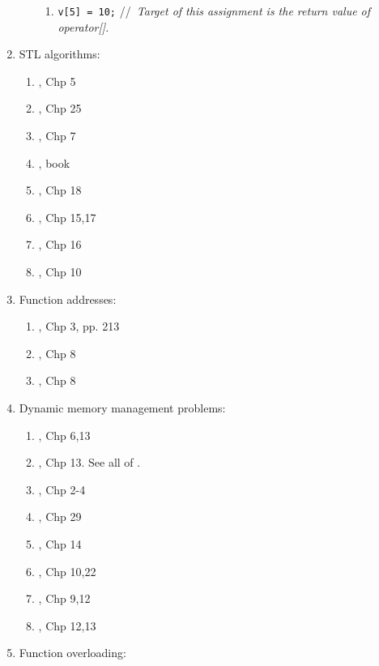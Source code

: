 \begin{enumerate}
\begin{enumerate}
\begin{enumerate}
		\item {\tt v[5] = 10;} //{\it\ Target of this assignment is the return value of operator[].}
		\end{enumerate}
	\end{enumerate}
\item STL algorithms: \vspace{-0.3cm}
	\begin{enumerate} \itemsep -2pt
	\item \cite{Eckel2003}, Chp 5
	\item \cite{Oualline2003}, Chp 25
	\item \cite{Vermeir2001}, Chp 7
	\item \cite{Reese2006a}, book
	\item \cite{Allain2012}, Chp 18
	\item \cite{Gregoire2014}, Chp 15,17
	\item \cite{Prata2012}, Chp 16
	\item \cite{Lippman2013}, Chp 10
	\end{enumerate}
\item Function addresses: \vspace{-0.3cm}
	\begin{enumerate} \itemsep -2pt
	\item \cite{Eckel2000}, Chp 3, pp. 213
	\item \cite{Stroustrup2014}, Chp 8
	\item \cite{Stroustrup2009}, Chp 8
	\end{enumerate}
\item Dynamic memory management problems: \vspace{-0.3cm}
	\begin{enumerate} \itemsep -2pt
	\item \cite{Eckel2000}, Chp 6,13
	\item \cite{Gaddis2010}, Chp 13. See all of \cite{Gaddis2010,Gaddis2011,Gaddis2012}.
	\item \cite{Meyer2005}, Chp 2-4
	\item \cite{Schildt2003}, Chp 29
	\item \cite{Allain2012}, Chp 14
	\item \cite{Gregoire2014}, Chp 10,22
	\item \cite{Prata2012}, Chp 9,12
	\item \cite{Lippman2013}, Chp 12,13
	\end{enumerate}
\item Function overloading: \vspace{-0.3cm}

\end{enumerate}
